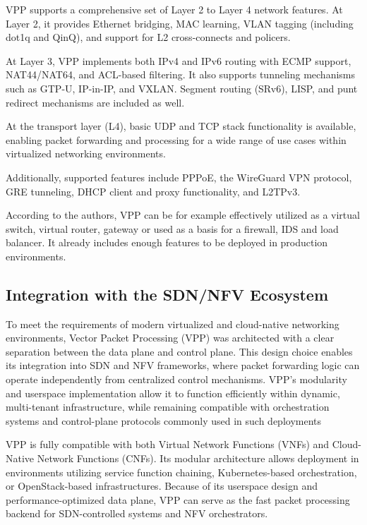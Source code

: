 VPP supports a comprehensive set of Layer 2 to Layer 4 network features. 
At Layer 2, it provides Ethernet bridging, MAC learning, VLAN tagging (including dot1q and QinQ), and support for L2 cross-connects and policers.

At Layer 3, VPP implements both IPv4 and IPv6 routing with ECMP support, NAT44/NAT64, and ACL-based filtering. 
It also supports tunneling mechanisms such as GTP-U, IP-in-IP, and VXLAN. Segment routing (SRv6), LISP, and punt redirect mechanisms are included as well.

At the transport layer (L4), basic UDP and TCP stack functionality is available, 
enabling packet forwarding and processing for a wide range of use cases within virtualized networking environments.

Additionally, supported features include PPPoE, the WireGuard VPN protocol, GRE tunneling, DHCP client and proxy functionality, and L2TPv3.\cite{fdio-vpp-features-2502}

According to the authors, VPP can be for example effectively utilized as a virtual switch, virtual router, gateway or used as a basis for a firewall, IDS and load balancer.\cite{fdio_what_is_vpp}
It already includes enough features to be deployed in production environments.



\subsection{Integration with the SDN/NFV Ecosystem}
To meet the requirements of modern virtualized and cloud-native networking environments, Vector Packet Processing (VPP) was architected with a clear separation between the data plane and control plane. 
This design choice enables its integration into SDN and NFV frameworks, where packet forwarding logic can operate independently from centralized control mechanisms. 
VPP's modularity and userspace implementation allow it to function efficiently within dynamic, multi-tenant infrastructure, 
while remaining compatible with orchestration systems and control-plane protocols commonly used in such deployments

VPP is fully compatible with both Virtual Network Functions (VNFs) and Cloud-Native Network Functions (CNFs). 
Its modular architecture allows deployment in environments utilizing service function chaining, Kubernetes-based orchestration, or OpenStack-based infrastructures. 
Because of its userspace design and performance-optimized data plane, VPP can serve as the fast packet processing backend for SDN-controlled systems and NFV orchestrators.\cite{fdio2017whitepaper}

